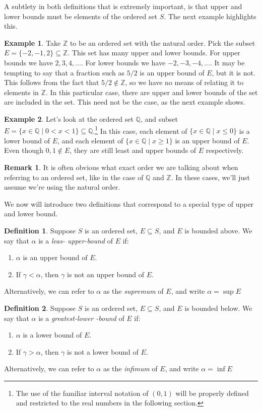 \documentclass{article}
\newcommand{\Q}{\mathbb{Q}}
\newcommand{\Z}{\mathbb{Z}}
\theoremstyle{definition}
\newtheorem{definition}{Definition}[section]
\newtheorem{example}{Example}[section]
\newtheorem{remark}{Remark}[section]
\begin{document}
A subtlety in both definitions that is extremely important, is that upper and lower bounds must be elements of the ordered set $ S $. The next example highlights this. 
\begin{example}
 Take $ \Z $ to be an ordered set with the natural order. Pick the subset $ E=\{-2,-1,2\}\subseteq \Z $. This set has many upper and lower bounds. For upper bounds we have $ 2,3,4,\ldots $. For lower bounds we have $ -2,-3,-4,\ldots
  $. It may be tempting to say that a fraction such as $ 5/2 $ is an upper bound of $ E $, but it is not. This follows from the fact that $ 5/2\notin \Z $, so we have no means of relating it to elements in $ \Z $. In this particular case, there are upper and lower bounds of the set are included in the set. This need not be the case, as the next example shows.  
\end{example}
\begin{example}
	Let's look at the ordered set $ \Q $, and subset $ E=\{x\in\Q\mid 0<x<1\}\subseteq \Q $.\footnote{The use of the familiar interval notation of $ (0,1) $ will be properly defined and restricted to the real numbers in the following section.} In this case, each element of $ \{x\in\Q\mid x\le 0\} $ is a lower bound of $ E $, and  each element of $ \{x\in\Q\mid x\ge 1\} $ is an upper bound of $ E $. Even though $ 0,1\notin E $, they are still least and upper bounds of $ E $ respectively. 
\end{example}
\begin{remark}
	It is often obvious what exact order we are talking about when referring to an ordered set, like in the case of $ \Q $ and $ \Z $. In these cases, we'll just assume we're using the natural order.  
\end{remark}
We now will introduce two definitions that correspond to a special type of upper and lower bound.
\begin{definition}
	Suppose $ S $ is an ordered set, $ E\subseteq S $, and $ E $ is bounded above. We say that $ \alpha $ is a \textit{\color{red}leas- upper-bound} of $ E $ if:
	\begin{enumerate}
		\item $ \alpha $ is an upper bound of $ E $.
		\item If $ \gamma<\alpha $, then $ \gamma $ is not an upper bound of $ E $.
	\end{enumerate}
Alternatively, we can refer to $ \alpha $ as the \textit{\color{red}supremum} of $ E $, and write $ \alpha=\sup E $
\end{definition}
\begin{definition}
	Suppose $ S $ is an ordered set, $ E\subseteq S $, and $ E $ is bounded below. We say that $ \alpha $ is a \textit{\color{red}greatest-lower -bound} of $ E $ if:
	\begin{enumerate}
		\item $ \alpha $ is a lower bound of $ E $.
		\item If $ \gamma>\alpha $, then $ \gamma $ is not a lower bound of $ E $.
	\end{enumerate}
	Alternatively, we can refer to $ \alpha $ as the \textit{\color{red}infimum} of $ E $, and write $ \alpha=\inf E $
\end{definition}
\end{document}
